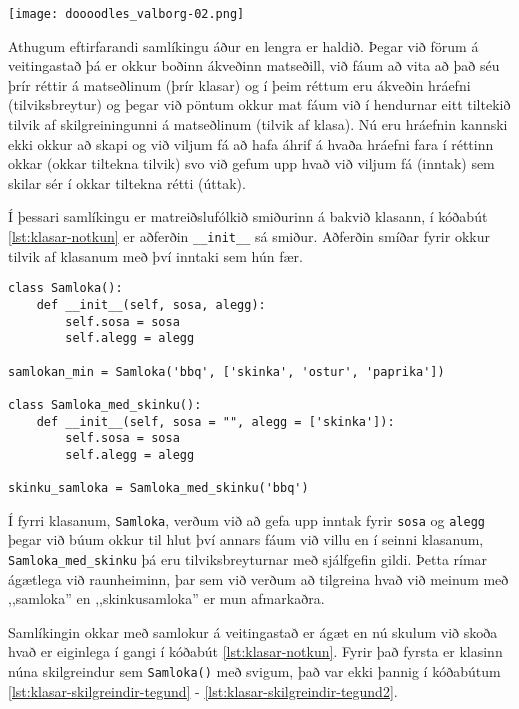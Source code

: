 \phantom{easter egg}
\begin{center}
	\texttt{[image: doooodles\_valborg-02.png]}
\end{center}

Athugum eftirfarandi samlíkingu áður en lengra er haldið.
Þegar við förum á veitingastað þá er okkur boðinn ákveðinn matseðill, við fáum að vita að það séu þrír réttir á matseðlinum (þrír klasar) og í þeim réttum eru ákveðin hráefni (tilviksbreytur) og þegar við pöntum okkur mat fáum við í hendurnar eitt tiltekið tilvik af skilgreiningunni á matseðlinum (tilvik af klasa).
Nú eru hráefnin kannski ekki okkur að skapi og við viljum fá að hafa áhrif á hvaða hráefni fara í réttinn okkar (okkar tiltekna tilvik) svo við gefum upp hvað við viljum fá (inntak) sem skilar sér í okkar tiltekna rétti (úttak).

Í þessari samlíkingu er matreiðslufólkið smiðurinn á bakvið klasann, í kóðabút \ref{lst:klasar-notkun} er aðferðin \texttt{\_\_init\_\_} sá smiður.
Aðferðin smíðar fyrir okkur tilvik af klasanum með því inntaki sem hún fær.

\begin{lstlisting}[caption=Klasar skilgreindir með töfraaðferðinni \_\_init\_\_, label=lst:klasar-notkun]
class Samloka():
	def __init__(self, sosa, alegg):
		self.sosa = sosa
		self.alegg = alegg
		
samlokan_min = Samloka('bbq', ['skinka', 'ostur', 'paprika'])

class Samloka_med_skinku():
	def __init__(self, sosa = "", alegg = ['skinka']):
		self.sosa = sosa
		self.alegg = alegg
		
skinku_samloka = Samloka_med_skinku('bbq')
\end{lstlisting}

Í fyrri klasanum, \texttt{Samloka}, verðum við að gefa upp inntak fyrir \texttt{sosa} og \texttt{alegg} þegar við búum okkur til hlut því annars fáum við villu en í seinni klasanum, \texttt{Samloka\_med\_skinku} þá eru tilviksbreyturnar með sjálfgefin gildi.
Þetta rímar ágætlega við raunheiminn, þar sem við verðum að tilgreina hvað við meinum með ,,samloka'' en ,,skinkusamloka'' er mun afmarkaðra.

Samlíkingin okkar með samlokur á veitingastað er ágæt en nú skulum við skoða hvað er eiginlega í gangi í kóðabút \ref{lst:klasar-notkun}.
Fyrir það fyrsta er klasinn núna skilgreindur sem \texttt{Samloka()} með svigum, það var ekki þannig í kóðabútum \ref{lst:klasar-skilgreindir-tegund} - \ref{lst:klasar-skilgreindir-tegund2}.

